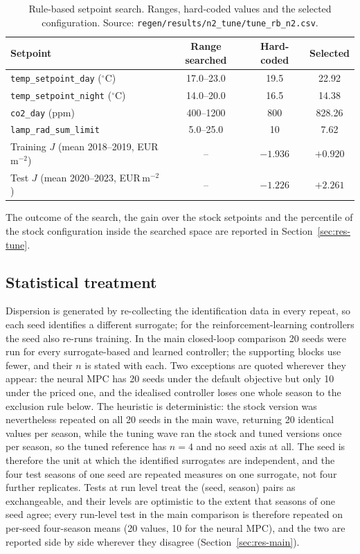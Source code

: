 \begin{table}[htbp]
\centering
\caption{Rule-based setpoint search. Ranges, hard-coded values and the selected
configuration. Source: \texttt{regen/results/n2\_tune/tune\_rb\_n2.csv}.}
\label{tab:rbtune}
\small
\begin{tabular}{@{}lccc@{}}
\toprule
Setpoint & Range searched & Hard-coded & Selected \\
\midrule
\texttt{temp\_setpoint\_day} ($^\circ$C)  & 17.0--23.0 & 19.5 & 22.92 \\
\texttt{temp\_setpoint\_night} ($^\circ$C)& 14.0--20.0 & 16.5 & 14.38 \\
\texttt{co2\_day} (ppm)                   & 400--1200  & 800  & 828.26 \\
\texttt{lamp\_rad\_sum\_limit}            & 5.0--25.0  & 10   & 7.62 \\
\midrule
Training $J$ (mean 2018--2019, EUR\,m$^{-2}$) & -- & $-1.936$ & $+0.920$ \\
Test $J$ (mean 2020--2023, EUR\,m$^{-2}$)     & -- & $-1.226$ & $+2.261$ \\
\bottomrule
\end{tabular}
\end{table}

The outcome of the search, the gain over the stock setpoints and the percentile of the
stock configuration inside the searched space are reported in
Section~\ref{sec:res-tune}.

\subsection{Statistical treatment}
\label{sec:stats}

Dispersion is generated by re-collecting the identification data in every repeat, so each
seed identifies a different surrogate; for the reinforcement-learning controllers the seed
also re-runs training. In the main closed-loop comparison 20 seeds were run for every
surrogate-based and learned controller; the supporting blocks use fewer, and their $n$ is
stated with each. Two exceptions are quoted wherever they appear: the neural MPC has 20
seeds under the default objective but only 10 under the priced one, and the idealised
controller loses one whole season to the exclusion rule below. The heuristic is
deterministic: the stock version was nevertheless repeated on all 20 seeds in the main wave,
returning 20 identical values per season, while the tuning wave ran the stock and tuned
versions once per season, so the tuned reference has $n=4$ and no seed axis at all.
The seed is therefore the unit at which the identified surrogates are independent, and the
four test seasons of one seed are repeated measures on one surrogate, not four further
replicates. Tests at run level treat the (seed, season) pairs as exchangeable, and their
levels are optimistic to the extent that seasons of one seed agree; every run-level test
in the main comparison is therefore repeated on per-seed four-season means (20 values, 10
for the neural MPC), and the two are reported side by side wherever they disagree
(Section~\ref{sec:res-main}).

